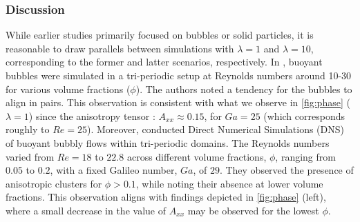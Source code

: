 \subsubsection*{Discussion}
While earlier studies primarily focused on bubbles or solid particles, it is reasonable to draw parallels between simulations with $\lambda = 1$ and $\lambda = 10$, corresponding to the former and latter scenarios, respectively. In \citet{bunner2002dynamics}, buoyant bubbles were simulated in a tri-periodic setup at Reynolds numbers around 10-30 for various volume fractions ($\phi$). The authors noted a tendency for the bubbles to align in pairs. %
This observation is consistent with what we observe in \ref{fig:phase} ($\lambda = 1$) since the anisotropy tensor : $A_{xx} \approx 0.15$, for $Ga = 25$ (which corresponds roughly to $Re = 25$). 
Moreover, \citet{zhang2021direct} conducted Direct Numerical Simulations (DNS) of buoyant bubbly flows within tri-periodic domains. The Reynolds numbers varied from $Re=18$ to $22.8$ across different volume fractions, $\phi$, ranging from $0.05$ to $0.2$, with a fixed Galileo number, $Ga$, of $29$. They observed the presence of anisotropic clusters for $\phi > 0.1$, while noting their absence at lower volume fractions. This observation aligns with findings depicted in \ref{fig:phase} (left), where a small decrease in the value of $A_{xx}$ may be observed for the lowest $\phi$.

